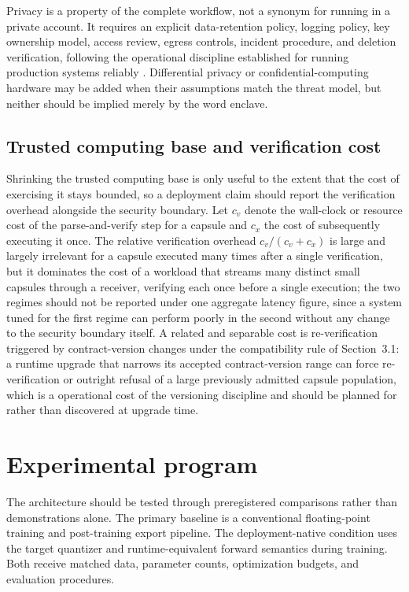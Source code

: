 \documentclass[11pt]{article}
\begin{document}
Privacy is a property of the complete workflow, not a synonym for running in a private account. It requires an explicit data-retention policy, logging policy, key ownership model, access review, egress controls, incident procedure, and deletion verification, following the operational discipline established for running production systems reliably \cite{beyer2016}. Differential privacy or confidential-computing hardware may be added when their assumptions match the threat model, but neither should be implied merely by the word enclave.

\subsection{Trusted computing base and verification cost}
Shrinking the trusted computing base is only useful to the extent that the cost of exercising it stays bounded, so a deployment claim should report the verification overhead alongside the security boundary. Let $c_v$ denote the wall-clock or resource cost of the parse-and-verify step for a capsule and $c_x$ the cost of subsequently executing it once. The relative verification overhead $c_v / (c_v + c_x)$ is large and largely irrelevant for a capsule executed many times after a single verification, but it dominates the cost of a workload that streams many distinct small capsules through a receiver, verifying each once before a single execution; the two regimes should not be reported under one aggregate latency figure, since a system tuned for the first regime can perform poorly in the second without any change to the security boundary itself. A related and separable cost is re-verification triggered by contract-version changes under the compatibility rule of Section~3.1: a runtime upgrade that narrows its accepted contract-version range can force re-verification or outright refusal of a large previously admitted capsule population, which is a operational cost of the versioning discipline and should be planned for rather than discovered at upgrade time.

\section{Experimental program}
The architecture should be tested through preregistered comparisons rather than demonstrations alone. The primary baseline is a conventional floating-point training and post-training export pipeline. The deployment-native condition uses the target quantizer and runtime-equivalent forward semantics during training. Both receive matched data, parameter counts, optimization budgets, and evaluation procedures.
\end{document}
